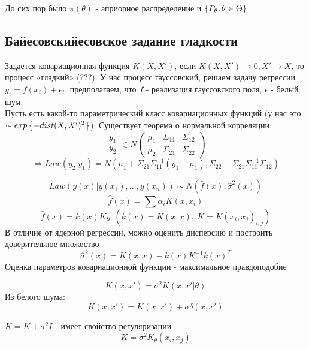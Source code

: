 До сих пор было $\pi(\theta)$ - априорное распределение и $\left\{ P_\theta, \theta \in \Theta \right\}$
\subsection*{Байесовскийесовское задание гладкости}
Задается ковариационная функция $K(X, X')$, если $K(X, X') \to 0, X' \to X$, то процесс «гладкий» (???). У нас процесс гауссовский, решаем задачу регрессии $y_i = f(x_i) + \epsilon_i$, предполагаем, что $f$ - реализация гауссовского поля, $\epsilon$ - белый шум. \\
Пусть есть какой-то параметрический класс ковариационных функций (у нас это $\sim exp\left\{ -dist(X, X')^2 \right\}$).
Существует теорема о нормальной корреляции:
$$ \begin{array}{c} y_1 \\ y_2 \end{array} \in N 
\begin{pmatrix} 
\mu_1 & \Sigma_{11} & \Sigma_{12} \\ 
\mu_2 & \Sigma_{21} & \Sigma_{22}	
\end{pmatrix}$$
$$ \Rightarrow Law(y_2|y_1) = N(\mu_1 + \Sigma_{21} \Sigma_{11}^{-1} (y_1-\mu_1), \Sigma_{22} - \Sigma_{21}\Sigma_{11}^{-1}\Sigma_{12})  $$

$$  Law(y(x)|y(x_1), \ldots, y(x_n)) \sim N(\hat{f}(x), \hat{\sigma}^2(x)) $$
$$ \hat{f}(x) = \sum \alpha_i K(x, x_i) $$
$$ \hat{f}(x) = k(x) K y \ \ (k(x) = K(x,x), \ K=K(x_i, x_j)_{i,j})$$
В отличие от ядерной регрессии, можно оценить дисперсию и построить доверительное множество
$$ \hat{\sigma}^2(x) = K(x,x) - k(x)K^{-1}k(x)^T $$
Оценка параметров ковариационной функции - максимальное правдоподобие

$$K(x,x') = \sigma^2 K(x,x'|\theta)$$
Из белого шума:
$$ K(x,x') = K(x,x') + \sigma \delta(x,x') $$

$K = K + \sigma^2I$ - имеет свойство регуляризации
$$ K = \sigma^2 K_{\theta}(x_i, x_j) $$
